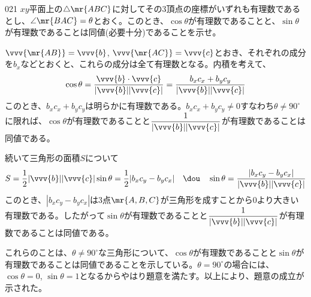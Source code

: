 \begin{thm}{021}{}{}
 $xy$平面上の$\triangle\mr{ABC}$に対してその3頂点の座標がいずれも有理数であるとし、$\angle\mr{BAC}=\theta$とおく。このとき、$\cos\theta$が有理数であることと、$\sin\theta$が有理数であることは同値(必要十分)であることを示せ。
\end{thm}

$\vvv{\mr{AB}}=\vvv{b}$, $\vvv{\mr{AC}}=\vvv{c}$とおき、それぞれの成分を$b_x$などとおくと、これらの成分は全て有理数となる。内積を考えて、
\[ \cos\theta=\frac{\vvv{b}\cdot\vvv{c}}{|\vvv{b}||\vvv{c}|}=\frac{b_xc_x+b_yc_y}{|\vvv{b}||\vvv{c}|} \]
このとき、$b_xc_x+b_yc_y$は明らかに有理数である。$b_xc_x+b_yc_y\neq 0$すなわち$\theta\neq 90^\circ$に限れば、$\cos\theta$が有理数であることと$\dfrac{1}{|\vvv{b}||\vvv{c}|}$が有理数であることは同値である。

続いて三角形の面積$S$について
\[ S=\frac{1}{2}|\vvv{b}||\vvv{c}|\sin\theta=\frac{1}{2}|b_xc_y-b_yc_x| \quad\dou\quad \sin\theta=\frac{|b_xc_y-b_yc_x|}{|\vvv{b}||\vvv{c}|} \]
このとき、$|b_xc_y-b_yc_x|$は3点$\mr{A,B,C}$が三角形を成すことから0より大きい有理数である。したがって$\sin\theta$が有理数であることと$\dfrac{1}{|\vvv{b}||\vvv{c}|}$が有理数であることは同値である。

これらのことは、$\theta\neq 90^\circ$な三角形について、$\cos\theta$が有理数であることと$\sin\theta$が有理数であることは同値であることを示している。$\theta=90^\circ$の場合には、$\cos\theta=0$, $\sin\theta=1$となるからやはり題意を満たす。以上により、題意の成立が示された。